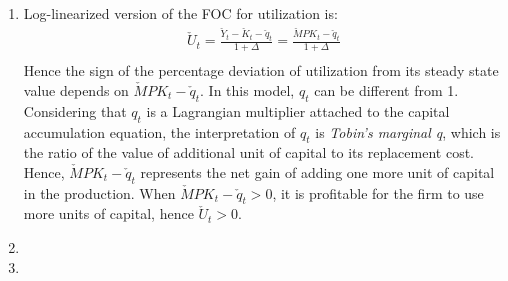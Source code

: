 \documentclass[11pt]{amsart}
\begin{document}
\begin{enumerate}[label = (\alph*)]
	\item Log-linearized version of the FOC for utilization is:
	\begin{align*}
	\check U_t = \frac{\check Y_t  - \check K_t - \check q_t}{1 + \Delta} = \frac{\check MPK_t - \check q_t}{1 + \Delta} \\
	\end{align*}
	Hence the sign of the percentage deviation of utilization from its steady state value depends on $\check MPK_t - \check q_t$. In this model, $q_t$ can be different from 1. Considering that $q_t$ is a Lagrangian multiplier attached to the capital accumulation equation, the interpretation of $q_t$ is \textit{Tobin's marginal q}, which is the ratio of the value of additional unit of capital to its replacement cost. Hence, $\check MPK_t - \check q_t$ represents the net gain of adding one more unit of capital in the production. When $\check MPK_t - \check q_t > 0$, it is profitable for the firm to use more units of capital, hence $\check U_t >0$. 
	\item 
	\item 
\end{enumerate}
\end{document}
